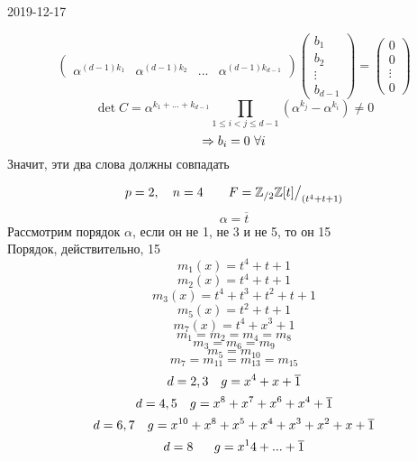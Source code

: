 \documentclass[main]{subfiles}
\begin{document}
\begin{lect}{2019-12-17}
\begin{Definition}
\[\begin{pmatrix}
            \\
            \alpha^{(d - 1)k_1} & \alpha^{(d - 1)k_2} & ... & \alpha^{(d - 1)k_{d - 1} }
        \end{pmatrix} \begin{pmatrix}
            b_1\\
            b_2\\
            \vdots\\
            b_{d - 1}
        \end{pmatrix} = \begin{pmatrix}
            0\\
            0\\
            \vdots\\
            0
        \end{pmatrix}\]
        \[\det C = \alpha^{k_1 + ... + k_{d - 1} } \prod_{1 \leq i < j \leq d - 1}(\alpha^{k_j} - \alpha^{k_i})
        \neq 0\]
        \[\Rightarrow b_i = 0 \ \forall i\]
        Значит, эти два слова должны совпадать
    \end{Definition}

    \begin{Example}
        \[p = 2, \quad n = 4 \qquad F = \mathbb{Z}_{/2}\mathbb{Z}[t]\big/_{(t^4 + t + 1)}  \]
        \[\alpha = \overline{t}\]
        Рассмотрим порядок $\alpha$, если он не 1, не 3 и не 5, то он 15\\
        Порядок, действительно, 15
        \[m_1(x) = t^4  + t + 1\]
        \[m_2(x) = t^4 + t + 1\]
        \[m_3(x) = t^4 + t^3 + t^2 + t + 1\]
        \[m_5(x) = t^2 + t + 1\]
        \[m_{7}(x) = t^4 + x^3 + 1 \]
        \[m_1 = m_2 = m_4 = m_8 \]
        \[m_3 = m_6 = m_9\]
        \[m_5 = m_{10} \]
        \[m_7 = m_{11}  = m_{13}  = m_{15} \]
        \[d = 2, 3 \quad g = x^4 + x + \overline{1}\]
        \[d = 4, 5 \quad g = x^8 + x^7 + x^6 + x^4 + \overline{1}\]
        \[d = 6, 7 \quad g = x^{10} + x^8 + x^5 + x^4 + x^3 + x^2 + x + \overline{1} \]
        \[d = 8 \ \ \quad g = x^14 + ... + \overline{1}\]
    \end{Example}
\end{lect}
\end{document}
